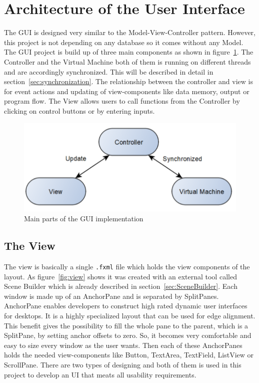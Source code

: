 \section{Architecture of the User Interface}
The GUI is designed very similar to the Model-View-Controller pattern. However, this project is not depending on any database so it comes without any Model. The GUI project is build up of three main components as shown in figure~\ref{fig:partsOfGui}. The Controller and the Virtual Machine both of them is running on different threads and are accordingly synchronized. This will be described in detail in section~\ref{sec:synchronization}. The relationship between the controller and view is for event actions and updating of view-components like data memory, output or program flow. The View allows users to call functions from the Controller by clicking on control buttons or by entering inputs. 
\begin{figure}[h] 
	\centering
	\includegraphics[scale=.70]{images/modelOfGui.png}
	\caption{Main parts of the GUI implementation}
	\label{fig:partsOfGui}
\end{figure}
\subsection{The View}
The view is basically a single \lstinline$.fxml$ file which holds the view components of the layout. As figure~\ref{fig:view} shows it was created with an external tool called Scene Builder which is already described in section~\ref{sec:SceneBuilder}. Each window is made up of an AnchorPane and is separated by SplitPanes. AnchorPane enables developers to construct high rated dynamic user interfaces for desktops. It is a highly specialized layout that can be used for edge alignment. This benefit gives the possibility to fill the whole pane to the parent, which is a SplitPane, by setting anchor offsets to zero. So, it becomes very comfortable and easy to size every window as the user wants. Then each of these AnchorPanes holds the needed view-components like Button, TextArea, TextField, ListView or ScrollPane. 
There are two types of designing and both of them is used in this project to develop an UI that meats all usability requirements.
